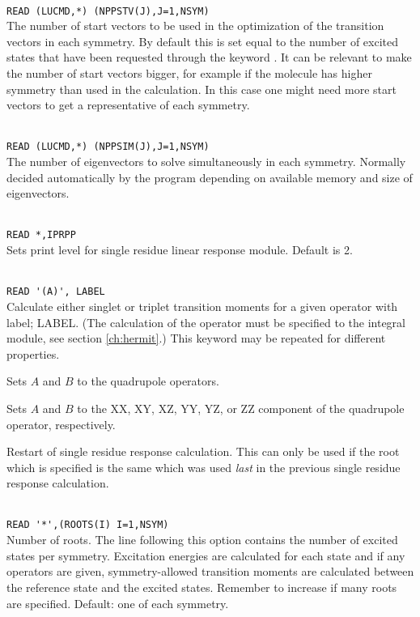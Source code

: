 \begin{description}
\item{}\\
\verb|READ (LUCMD,*) (NPPSTV(J),J=1,NSYM)|\\
 The number of start vectors to be used in the
  optimization of the transition vectors in each symmetry. By default
  this is set equal to the number of excited states that have been
  requested through the keyword .
  It can be relevant to make the number of start vectors bigger,
  for example if the molecule has higher symmetry than used in the
  calculation. In this case one might need more start vectors to
  get a representative of each symmetry.


\item{}\\
\verb|READ (LUCMD,*) (NPPSIM(J),J=1,NSYM)|\\
The number of eigenvectors to solve simultaneously in each
symmetry. Normally decided automatically by the program depending on
available memory and size of eigenvectors.

\item{}\\
\verb|READ *,IPRPP|\\
Sets print level for single residue linear response module. Default is 2.

\item{}\\
\verb|READ '(A)', LABEL|\\
Calculate either singlet or triplet transition moments for a given operator with label; LABEL.
(The calculation of the operator must be specified to the integral
module, see section \ref{ch:hermit}.)
This keyword may be repeated for different properties.

\item{}
Sets $A$ and $B$ to the quadrupole operators.

\item{}
Sets $A$ and $B$ to the XX, XY, XZ, YY, YZ, or ZZ component of the
quadrupole operator, respectively.

\item{}
Restart of single residue response
calculation. This can only be used if the root which is
specified is the same which was used \textit{last} in the previous
single residue response calculation.

\item{}\\
\verb|READ '*',(ROOTS(I) I=1,NSYM)|\\
Number of roots.  The line following this option contains the number
of excited states per symmetry. Excitation
energies are calculated for each state and if
any operators are given,
symmetry-allowed transition moments are
calculated between the
reference state and the excited states.
Remember to increase  if many roots are specified.
Default: one of each symmetry.


\end{description}
